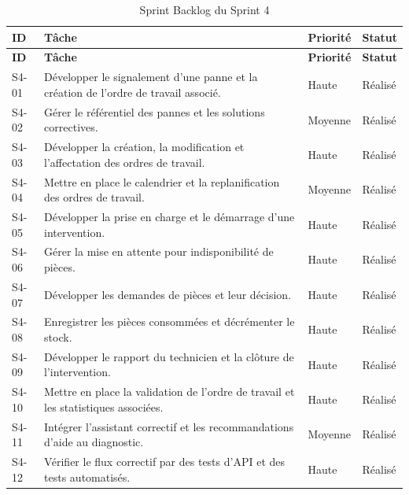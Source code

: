 {\footnotesize
\setlength{\tabcolsep}{4pt}
\begin{longtable}{|p{0.9cm}|p{10.9cm}|p{1.4cm}|p{1.4cm}|}
\caption{Sprint Backlog du Sprint 4}
\label{tab:sprint4-backlog}\\
\hline
\textbf{ID} & \textbf{Tâche} & \textbf{Priorité} & \textbf{Statut} \\
\hline
\endfirsthead

\hline
\textbf{ID} & \textbf{Tâche} & \textbf{Priorité} & \textbf{Statut} \\
\hline
\endhead

S4-01 &
Développer le signalement d'une panne et la création de l'ordre de travail associé. &
Haute & Réalisé \\
\hline

S4-02 &
Gérer le référentiel des pannes et les solutions correctives. &
Moyenne & Réalisé \\
\hline

S4-03 &
Développer la création, la modification et l'affectation des ordres de travail. &
Haute & Réalisé \\
\hline

S4-04 &
Mettre en place le calendrier et la replanification des ordres de travail. &
Moyenne & Réalisé \\
\hline

S4-05 &
Développer la prise en charge et le démarrage d'une intervention. &
Haute & Réalisé \\
\hline

S4-06 &
Gérer la mise en attente pour indisponibilité de pièces. &
Haute & Réalisé \\
\hline

S4-07 &
Développer les demandes de pièces et leur décision. &
Haute & Réalisé \\
\hline

S4-08 &
Enregistrer les pièces consommées et décrémenter le stock. &
Haute & Réalisé \\
\hline

S4-09 &
Développer le rapport du technicien et la clôture de l'intervention. &
Haute & Réalisé \\
\hline

S4-10 &
Mettre en place la validation de l'ordre de travail et les statistiques associées. &
Haute & Réalisé \\
\hline

S4-11 &
Intégrer l'assistant correctif et les recommandations d'aide au diagnostic. &
Moyenne & Réalisé \\
\hline

S4-12 &
Vérifier le flux correctif par des tests d'API et des tests automatisés. &
Haute & Réalisé \\
\hline

\end{longtable}}

